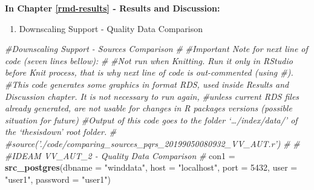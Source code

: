 \documentclass[12pt,oneside]{reedthesis}
\newenvironment{Shaded}{\begin{snugshade}}{\end{snugshade}}
\newcommand{\CommentTok}[1]{\textcolor[rgb]{0.56,0.35,0.01}{\textit{#1}}}
\newcommand{\DataTypeTok}[1]{\textcolor[rgb]{0.13,0.29,0.53}{#1}}
\newcommand{\DecValTok}[1]{\textcolor[rgb]{0.00,0.00,0.81}{#1}}
\newcommand{\KeywordTok}[1]{\textcolor[rgb]{0.13,0.29,0.53}{\textbf{#1}}}
\newcommand{\NormalTok}[1]{#1}
\newcommand{\StringTok}[1]{\textcolor[rgb]{0.31,0.60,0.02}{#1}}
\providecommand{\tightlist}{%
  \setlength{\itemsep}{0pt}\setlength{\parskip}{0pt}}
\begin{document}
\textbf{In Chapter \ref{rmd-results} - Results and Discussion:}
\begin{enumerate}
\def\labelenumi{\arabic{enumi}.}
\tightlist
\item
  Downscaling Support - Quality Data Comparison
\end{enumerate}
\tiny
\begin{Shaded}
\begin{Highlighting}[]
\CommentTok{#Downscaling Support - Sources Comparison}
\CommentTok{#}
\CommentTok{#Important Note for next line of code (seven lines bellow):}
\CommentTok{#}
\CommentTok{#Not run when Knitting. Run it only in RStudio before Knit process, that is why next line of code is out-commented (using #). }
\CommentTok{#This code generates some graphics in format RDS, used inside Results and Discussion chapter. It is not necessary to run again, }
\CommentTok{#unless current RDS files already generated, are not usable for changes in R packages versions (possible situation for future)}
\CommentTok{#Output of this code goes to the folder ‘…/index/data/’ of the ‘thesisdown’ root folder.}
\CommentTok{#}
\CommentTok{#source('./code/comparing_sources_pqrs_20199050080932_VV_AUT.r')}
\CommentTok{#}
\CommentTok{#}
\CommentTok{#IDEAM VV_AUT_2 - Quality Data Comparison}
\CommentTok{#}
\NormalTok{con1 =}\StringTok{ }\KeywordTok{src_postgres}\NormalTok{(}\DataTypeTok{dbname =} \StringTok{"winddata"}\NormalTok{, }\DataTypeTok{host =} \StringTok{"localhost"}\NormalTok{, }\DataTypeTok{port =} \DecValTok{5432}\NormalTok{, }\DataTypeTok{user =} \StringTok{"user1"}\NormalTok{, }\DataTypeTok{password =} \StringTok{"user1"}\NormalTok{)}


\end{Highlighting}
\end{Shaded}
\end{document}
